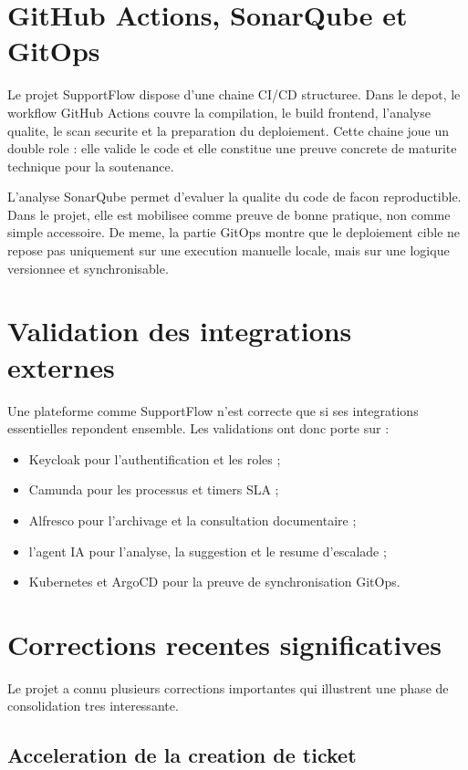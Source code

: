 \section{GitHub Actions, SonarQube et GitOps}

Le projet SupportFlow dispose d'une chaine CI/CD structuree. Dans le depot, le workflow GitHub Actions couvre la compilation, le build frontend, l'analyse qualite, le scan securite et la preparation du deploiement. Cette chaine joue un double role : elle valide le code et elle constitue une preuve concrete de maturite technique pour la soutenance.

L'analyse SonarQube permet d'evaluer la qualite du code de facon reproductible. Dans le projet, elle est mobilisee comme preuve de bonne pratique, non comme simple accessoire. De meme, la partie GitOps montre que le deploiement cible ne repose pas uniquement sur une execution manuelle locale, mais sur une logique versionnee et synchronisable.

\section{Validation des integrations externes}

Une plateforme comme SupportFlow n'est correcte que si ses integrations essentielles repondent ensemble. Les validations ont donc porte sur :

\begin{itemize}[leftmargin=1.2cm]
  \item Keycloak pour l'authentification et les roles ;
  \item Camunda pour les processus et timers SLA ;
  \item Alfresco pour l'archivage et la consultation documentaire ;
  \item l'agent IA pour l'analyse, la suggestion et le resume d'escalade ;
  \item Kubernetes et ArgoCD pour la preuve de synchronisation GitOps.
\end{itemize}

\section{Corrections recentes significatives}

Le projet a connu plusieurs corrections importantes qui illustrent une phase de consolidation tres interessante.

\subsection{Acceleration de la creation de ticket}

